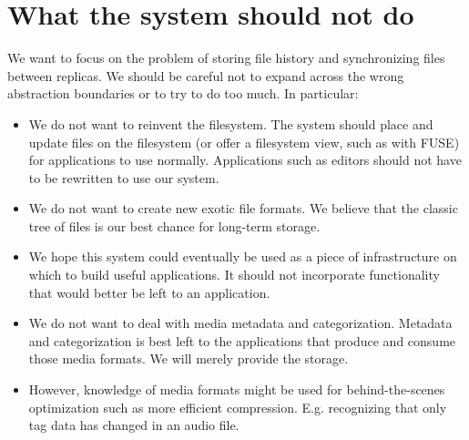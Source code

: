 %


\section{What the system should not do}

We want to focus on the problem of storing file history and synchronizing files
between replicas.
We should be careful not to expand across the wrong abstraction boundaries or to
try to do too much.
In particular:

\begin{itemize}

  \item We do not want to reinvent the filesystem. The system should place and
    update files on the filesystem (or offer a filesystem view, such as with
    FUSE) for applications to use normally. Applications such as editors should
    not have to be rewritten to use our system.

  \item We do not want to create new exotic file formats. We believe that the
    classic tree of files is our best chance for long-term storage.

  \item We hope this system could eventually be used as a piece of
    infrastructure on which to build useful applications. It should not
    incorporate functionality that would better be left to an application.

  \item We do not want to deal with media metadata and categorization. Metadata
    and categorization is best left to the applications that produce and consume
    those media formats. We will merely provide the storage.

  \item However, knowledge of media formats might be used for behind-the-scenes
    optimization such as more efficient compression. E.g. recognizing that only
    tag data has changed in an audio file.

\end{itemize}
